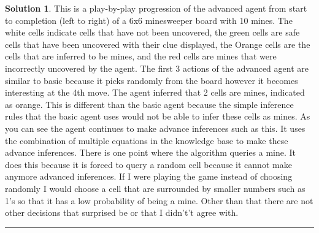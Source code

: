 \documentclass{article}
\theoremstyle{definition}
\def\fline{\rule{0.75\linewidth}{0.5pt}}
\newcommand{\finishline}{\vspace{-15pt}\begin{center}\fline\end{center}}
\newtheorem*{solution*}{Solution}
\newenvironment{solution}{\begin{solution*}}{{\finishline} \end{solution*}}
\begin{document}
\begin{solution}
	This is a play-by-play progression of the advanced agent from start to completion (left to right) of a 6x6 minesweeper board with 10 mines. The white cells indicate cells that have not been uncovered, the green cells are safe cells that have been uncovered with their clue displayed, the Orange cells are the cells that are inferred to be mines, and the red cells are mines that were incorrectly uncovered by the agent. The first 3 actions of the advanced agent are similar to basic because it picks randomly from the board however it becomes interesting at the 4th move. The agent inferred that 2 cells are mines, indicated as orange. This is different than the basic agent because the simple inference rules that the basic agent uses would not be able to infer these cells as mines. As you can see the agent continues to make advance inferences such as this. It uses the combination of multiple equations in the knowledge base to make these advance inferences. 
    There is one point where the algorithm queries a mine. It does this because it is forced to query a random cell because it cannot make anymore advanced inferences. If I were playing the game instead of choosing randomly I would choose a cell that are surrounded by smaller numbers such as 1’s so that it has a low probability of being a mine. Other than that there are not other decisions that surprised be or that I didn't’t agree with.

\end{solution}
\smallskip
\end{document}
